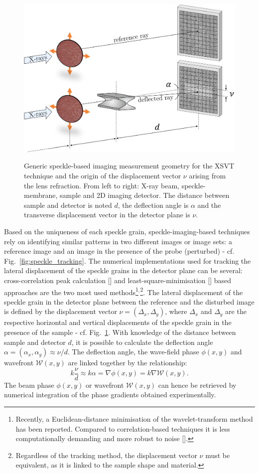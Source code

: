 \begin{refsection}
\begin{figure}[t]
        \centering
        {\includegraphics[width=0.6\linewidth]{figures/ch04/speckle_tracking2.png}}
        \caption[Speckle-based imaging geometry]{Generic speckle-based imaging measurement geometry for the XSVT technique and the origin of the displacement vector $\nu$ arising from the lens refraction. From left to right: X-ray beam, speckle-membrane, sample and 2D imaging detector. The distance between sample and detector is noted $d$, the deflection angle is $\alpha$ and the transverse displacement vector in the detector plane is $\nu$.} \label{fig:speckle_tracking2}
\end{figure}

Based on the uniqueness of each speckle grain, speckle-imaging-based techniques rely on identifying similar patterns in two different images or image sets: a reference image and an image in the presence of the probe (perturbed) - cf. Fig.~\ref{fig:speckle_tracking}. The numerical implementations used for tracking the lateral displacement of the speckle grains in the detector plane can be several: cross-correlation peak calculation [\cite{Berujon2012, Morgan2012}] and least-square-minimisation [\cite{Zanette2014, Zdora2017}] based approaches are the two most used methods\footnote{Recently, a Euclidean-distance minimisation of the wavelet-transform method has been reported. Compared to correlation-based techniques it is less computationally demanding and more robust to noise [\cite{Qiao2020b}].}$^{,}$\footnote{Regardless of the tracking method, the displacement vector $\nu$ must be equivalent, as it is linked to the sample shape and material.}. The lateral displacement of the speckle grain in the detector plane between the reference and the disturbed image is defined by the displacement vector $\nu=(\Delta_x,\Delta_y)$, where $\Delta_x$ and $\Delta_y$ are the respective horizontal and vertical displacements of the speckle grain in the presence of the sample - cf. Fig.~\ref{fig:speckle_tracking2}. With knowledge of the distance between sample and detector $d$, it is possible to calculate the deflection angle $\alpha=(\alpha_x,\alpha_y)\approx\nu/d$. The deflection angle, the wave-field phase $\phi(x,y)$ and wavefront $\mathcal{W}(x,y)$ are linked together by the relationship:
\begin{equation}\label{eq:wavefront_gradient}
    k\frac{\nu}{d} \approx k \alpha = \nabla\phi(x,y) = k \nabla\mathcal{W}(x,y).
\end{equation}
The beam phase $\phi(x,y)$ or wavefront $\mathcal{W}(x,y)$ can hence be retrieved by numerical integration of the phase gradients obtained experimentally.


\end{refsection}
